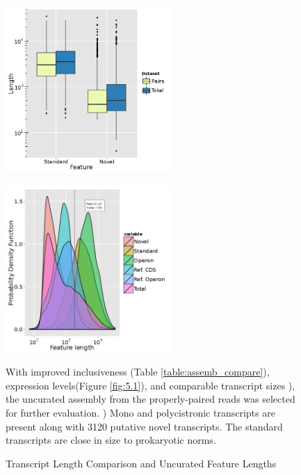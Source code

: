 \begin{figure}[t]
\small
\begin{center}
\begin{minipage}{.5\textwidth}
\begin{center}
{\includegraphics[width=\linewidth,height=2.5in]{images/Assembly/Comparison/TotvsPaired_length.png}
\label{fig:5.2a}}
\end{center}
\end{minipage}%
\begin{minipage}{.5\textwidth}
\begin{center}
{\includegraphics[width=\linewidth,height=2.5in]{images/Assembly/Summary/ffeature_length_1.png}
\label{fig:5.2b}}
\end{center}
\end{minipage}
\end{center}
\caption{Transcript Length Comparison and Uncurated Feature Lengths}
With improved inclusiveness (Table \ref{table:assemb_compare}), expression levels(Figure \ref{fig:5.1}), and comparable transcript sizes ), the uncurated assembly from the properly-paired reads was selected for further evaluation. ) Mono and polycistronic transcripts are present along with 3120 putative novel transcripts. The standard transcripts are close in size to prokaryotic norms\cite{86}.
\end{figure}


